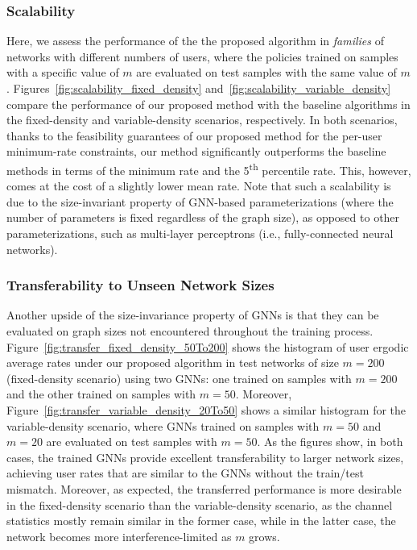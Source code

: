 \documentclass[lettersize,journal]{IEEEtran}
\begin{document}
\subsubsection{Scalability}
Here, we assess the performance of the the proposed algorithm in \emph{families} of networks with different numbers of users, where the policies trained on samples with a specific value of $m$ are evaluated on test samples with the same value of $m$. Figures~\ref{fig:scalability_fixed_density} and~\ref{fig:scalability_variable_density} compare the performance of our proposed method with the baseline algorithms in the fixed-density and variable-density scenarios, respectively. In both scenarios, thanks to the feasibility guarantees of our proposed method for the per-user minimum-rate constraints, our method significantly outperforms the baseline methods in terms of the minimum rate and the 5\textsuperscript{th} percentile rate. This, however, comes at the cost of a slightly lower mean rate. Note that such a scalability is due to the size-invariant property of GNN-based parameterizations (where the number of parameters is fixed regardless of the graph size), as opposed to other parameterizations, such as multi-layer perceptrons (i.e., fully-connected neural networks).

\subsubsection{Transferability to Unseen Network Sizes}
Another upside of the size-invariance property of GNNs is that they can be evaluated on graph sizes not encountered throughout the training process. Figure~\ref{fig:transfer_fixed_density_50To200} shows the histogram of user ergodic average rates under our proposed algorithm in test networks of size $m=200$ (fixed-density scenario) using two GNNs: one trained on samples with $m=200$ and the other trained on samples with $m=50$. Moreover, Figure~\ref{fig:transfer_variable_density_20To50} shows a similar histogram for the variable-density scenario, where GNNs trained on samples with $m=50$ and $m=20$ are evaluated on test samples with $m=50$. As the figures show, in both cases, the trained GNNs provide excellent transferability to larger network sizes, achieving user rates that are similar to the GNNs without the train/test mismatch. Moreover, as expected, the transferred performance is more desirable in the fixed-density scenario than the variable-density scenario, as the channel statistics mostly remain similar in the former case, while in the latter case, the network becomes more interference-limited as $m$ grows.
\end{document}
